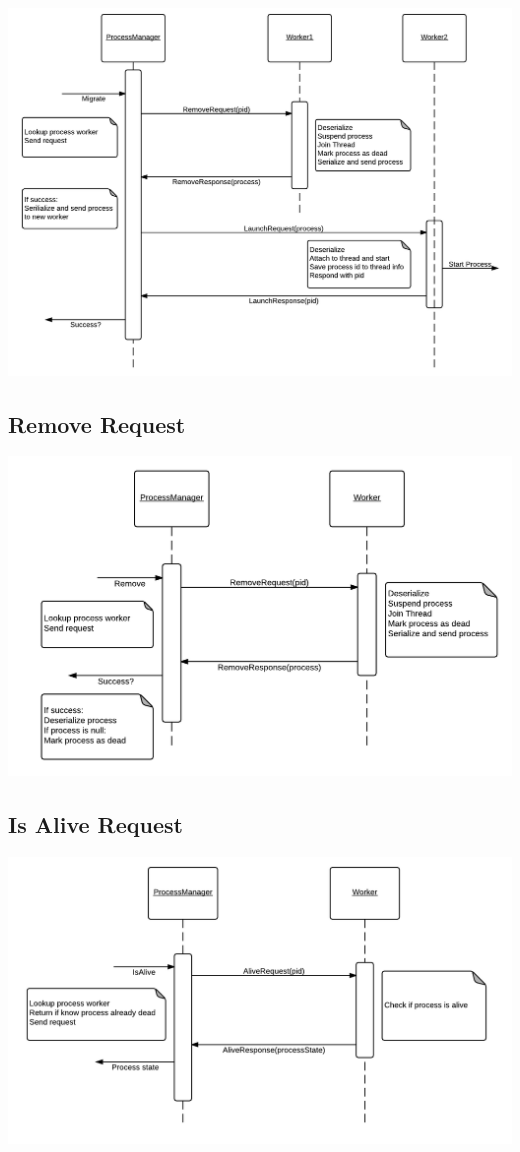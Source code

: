 \documentclass[12pt]{article}
\begin{document}
\includegraphics[scale=.3]{migrate.png}

\subsection{Remove Request}

\includegraphics[scale=.4]{remove.png}

\subsection{Is Alive Request}

\includegraphics[scale=.4]{alive.png}
\end{document}
